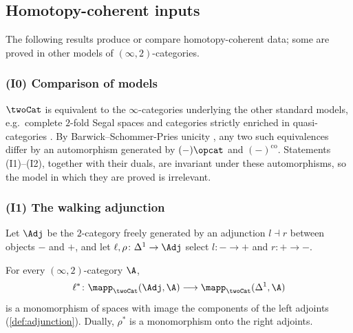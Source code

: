 \subsection{Homotopy-coherent inputs}
\label{subsec:2dloc-inputs}

The following results produce or compare homotopy-coherent data; some are proved in other models of $(\infty,2)$-categories.

\subsubsection*{(I0) Comparison of models}
$\twoCat$ is equivalent to the $\infty$-categories underlying the other standard models, e.g.\ complete $2$-fold Segal spaces \cite{gepnerhaugseng2015enriched} and categories strictly enriched in quasi-categories \cite{haugseng2015rectification}. By Barwick--Schommer-Pries unicity \cite{barwickschommerpries2021unicity}, any two such equivalences differ by an automorphism generated by $(-)\opcat$ and $(-)^{\mathrm{co}}$.
Statements (I1)--(I2), together with their duals, are invariant under these automorphisms, so the model in which they are proved is irrelevant.

\subsubsection*{(I1) The walking adjunction}
Let $\Adj$ be the $2$-category freely generated by an adjunction $l \dashv r$ between objects $-$ and $+$, and let $\ell,\rho\colon \Delta^{1} \to \Adj$ select $l\colon - \to +$ and $r\colon + \to -$.

\begin{thm}
\label{thm:walking-adjunction}
For every $(\infty,2)$-category $\A$,
\[
\ell^{*}\colon \mapp_{\twoCat}(\Adj,\A) \longrightarrow \mapp_{\twoCat}(\Delta^{1},\A)
\]
is a monomorphism of spaces with image the components of the left adjoints (\cref{def:adjunction}). Dually, $\rho^{*}$ is a monomorphism onto the right adjoints.
\end{thm}

